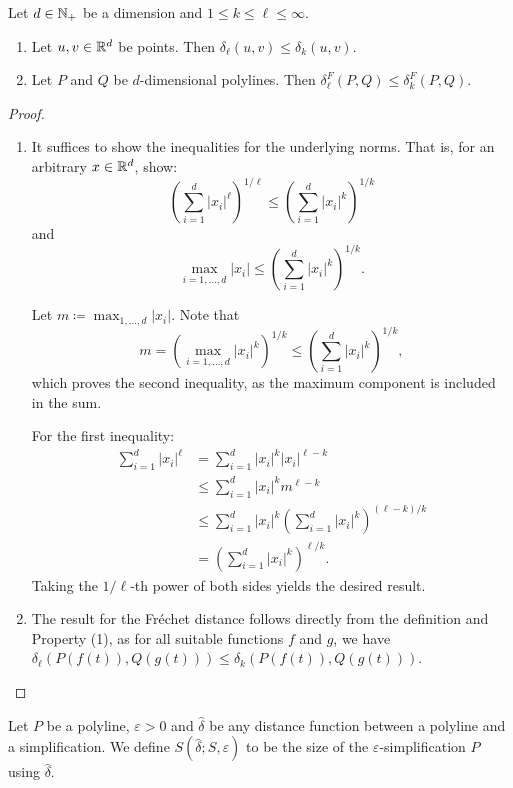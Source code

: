 \begin{lemma}\label{lem:monotonicity_minkowski}
  Let \(d \in \mathbb{N}_+\) be a dimension and \(1 \leq k \leq \ell \leq \infty\).
	\begin{enumerate}
		\item Let \(u, v \in \mathbb{R}^d\) be points. Then \(\delta_\ell(u,v) \leq \delta_k(u, v)\).
		\item Let \(P\) and \(Q\) be \(d\)-dimensional polylines. Then \(\delta_\ell^F(P, Q) \leq \delta_k^F(P, Q)\).
	\end{enumerate}
\end{lemma}

\begin{proof}
  \begin{enumerate}
		\item It suffices to show the inequalities for the underlying norms. That is, for an arbitrary \(x \in \mathbb{R}^d\), show:
			\[\left(\sum_{i=1}^d |x_i|^\ell\right)^{1/\ell} \leq \left(\sum_{i=1}^d |x_i|^k\right)^{1/k}\]
			and
			\[\max_{i=1, \dots, d} |x_i| \leq \left(\sum_{i=1}^d |x_i|^k\right)^{1/k}.\]

			Let \(m \coloneq \max_{1,\dots, d}|x_i|\). Note that
			\[m = \left(\max_{i=1, \dots, d} |x_i|^{k}\right)^{1/k} \leq \left(\sum_{i=1}^d |x_i|^{k}\right)^{1/k},\]
			which proves the second inequality, as the maximum component is included in the sum.

			For the first inequality:
			\begin{align*}
				\sum_{i=1}^d |x_i|^\ell &= \sum_{i=1}^d |x_i|^k|x_i|^{\ell - k} \\
				 &\leq \sum_{i=1}^d |x_i|^k m^{\ell - k} \\
				 &\leq \sum_{i=1}^d |x_i|^k \left(\sum_{i=1}^d |x_i|^{k}\right)^{(\ell-k)/k} \\
				 &= \left(\sum_{i=1}^d |x_i|^{k}\right)^{\ell/k}.
			\end{align*}
			Taking the \(1/\ell\)-th power of both sides yields the desired result.
		\item The result for the Fréchet distance follows directly from the definition and Property (1), as for all suitable functions \(f\) and \(g\), we have \(\delta_\ell(P(f(t)), Q(g(t))) \leq \delta_k(P(f(t)), Q(g(t)))\).
  \end{enumerate}
\end{proof}

\begin{definition}
	Let \(P\) be a polyline, \(\varepsilon > 0\) and \(\hat \delta\) be any distance function between a polyline and a simplification. We define \(S(\hat \delta; S, \varepsilon)\) to be the size of the \(\varepsilon\)-simplification \(P\) using \(\hat \delta\).
\end{definition}


